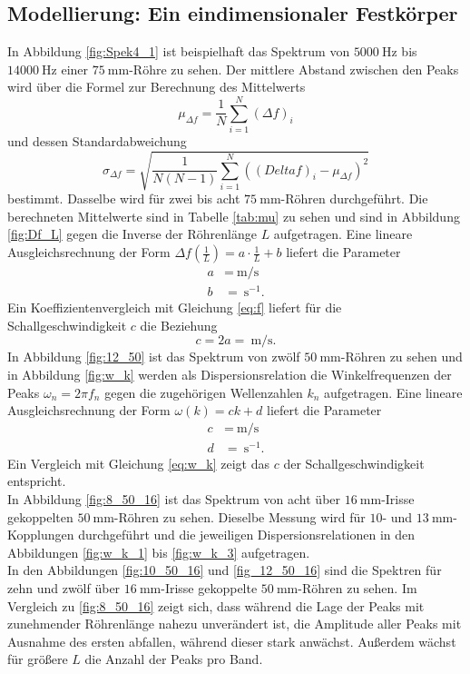 \subsection{Modellierung: Ein eindimensionaler Festkörper}

In Abbildung \ref{fig:Spek4_1} ist beispielhaft das Spektrum von  $\SI{5000}{\hertz}$ bis $\SI{14000}{\hertz}$ einer $\SI{75}{\milli\meter}$-Röhre zu sehen.
Der mittlere Abstand zwischen den Peaks wird über die Formel zur Berechnung des Mittelwerts
\[
\mu_{\Delta f} = \frac{1}{N}\sum_{i=1}^{N}(\Delta f)_i
\]
und dessen Standardabweichung
\[
\sigma_{\Delta f} = \sqrt{\frac{1}{N(N-1)}\sum_{i=1}^{N}((Delta f)_i-\mu_{\Delta f})^2}
\]
bestimmt. Dasselbe wird für zwei bis acht $\SI{75}{\milli\meter}$-Röhren durchgeführt. Die berechneten Mittelwerte sind in Tabelle
\ref{tab:mu} zu sehen und sind in Abbildung \ref{fig:Df_L} gegen die Inverse der Röhrenlänge $L$ aufgetragen. Eine lineare Ausgleichsrechnung der Form $\Delta f\left(\frac{1}{L}\right)= a\cdot\frac{1}{L}+b$ liefert die Parameter
\begin{align*}
a&=\SI{}{\meter\per\second}\\
b&=\SI{}{\second^{-1}}\text{.}
\end{align*}
Ein Koeffizientenvergleich mit Gleichung \eqref{eq:f} liefert für die Schallgeschwindigkeit $c$ die Beziehung
\[
c=2 a=\SI{}{\meter\per\second}\text{.}
\]
\newline
In Abbildung \ref{fig:12_50} ist das Spektrum von zwölf $\SI{50}{\milli\meter}$-Röhren zu sehen und in Abbildung \ref{fig:w_k} werden als Dispersionsrelation die Winkelfrequenzen der Peaks $\omega_n=2\pi f_n$ gegen die zugehörigen Wellenzahlen $k_n$ aufgetragen. Eine lineare Ausgleichsrechnung der Form $\omega(k)=c k + d$ liefert die Parameter
\begin{align*}
c&=\SI{}{\meter\per\second}\\
d&=\SI{}{\second^{-1}}\text{.}
\end{align*}
Ein Vergleich mit Gleichung \eqref{eq:w_k} zeigt das $c$ der Schallgeschwindigkeit entspricht.\\
In Abbildung \ref{fig:8_50_16} ist das Spektrum von acht über $\SI{16}{\milli\meter}$-Irisse gekoppelten $\SI{50}{\milli\meter}$-Röhren zu sehen. Dieselbe Messung wird für $10$- und $\SI{13}{\milli\meter}$-Kopplungen durchgeführt und die jeweiligen Dispersionsrelationen in den Abbildungen \ref{fig:w_k_1} bis \ref{fig:w_k_3} aufgetragen.\\
In den Abbildungen \ref{fig:10_50_16} und \ref{fig_12_50_16} sind die Spektren für zehn und zwölf über $\SI{16}{\milli\meter}$-Irisse gekoppelte $\SI{50}{\milli\meter}$-Röhren zu sehen. Im Vergleich zu \ref{fig:8_50_16} zeigt sich, dass während die Lage der Peaks  mit zunehmender Röhrenlänge nahezu unverändert ist, die Amplitude aller Peaks mit Ausnahme des ersten abfallen, während dieser stark anwächst. Außerdem wächst für größere $L$ die Anzahl der Peaks pro Band.\\
